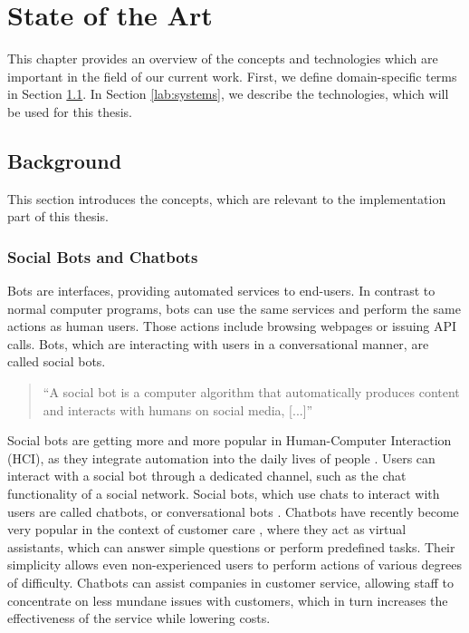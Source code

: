 \chapter{State of the Art}
This chapter provides an overview of the concepts and technologies which are important in the field of our current work. First, we define domain-specific terms in Section \ref{lab:background}. In Section \ref{lab:systems}, we describe the technologies, which will be used for this thesis.

\section{Background} \label{lab:background}

This section introduces the concepts, which are relevant to the implementation part of this thesis.

\subsection{Social Bots and Chatbots}\label{sec:chatbots}
Bots are interfaces, providing automated services to end-users.
In contrast to normal computer programs, bots can use the same services and perform the same actions as human users. Those actions include browsing webpages or issuing API calls.
Bots, which are interacting with users in a conversational manner, are called social bots.
\begin{quote}
    ``A social bot is a computer algorithm that automatically produces content and interacts with humans on social media, [...]'' \cite{FVD*16b}
\end{quote}
Social bots are getting more and more popular in Human-Computer Interaction (HCI), as they integrate automation into the daily lives of people \cite{BFPN17}. Users can interact with a social bot through a dedicated channel, such as the chat functionality of a social network.
Social bots, which use chats to interact with users are called chatbots, or conversational bots \cite{WWX*16,AAA17}.
Chatbots have recently become very popular in the context of customer care \cite{CHW*17,FVD*16b}, where they act as virtual assistants, which can answer simple questions \cite{CaWh14} or perform predefined tasks. 
Their simplicity allows even non-experienced users to perform actions of various degrees of difficulty. 
Chatbots can assist companies in customer service, allowing staff to concentrate on less mundane issues with customers, which in turn increases the effectiveness of the service while lowering costs. \cite{AAA17}

